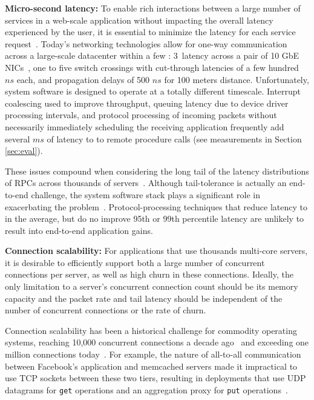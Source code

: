 {\bf Micro-second latency:} To enable rich interactions between a
large number of services in a web-scale application without impacting
the overall latency experienced by the user, it is essential to
minimize the latency for each service
request~\cite{luiz-isscc,rumble2011s}. Today's networking
technologies allow for one-way communication across a large-scale
datacenter within a few \microsecond : 3~\microsecond latency across
a pair of 10 GbE NICs~\cite{cisco-sereno}, one to five switch
crossings with cut-through latencies of a few hundred $ns$ each, and
propagation delays of 500 $ns$ for 100 meters distance. Unfortunately,
system software is designed to operate at a totally different
timescale. Interrupt coalescing used to improve throughput, queuing
latency due to device driver processing intervals, and protocol
processing of incoming packets without necessarily immediately
scheduling the receiving application frequently add several $ms$ of
latency to to remote procedure calls (see measurements in Section
\ref{sec:eval}).


These issues compound when considering the long tail of the latency
distributions of RPCs across thousands of
servers~\cite{DBLP:journals/cacm/DeanB13}. Although tail-tolerance is
actually an end-to-end challenge, the system software stack plays a
significant role in exacerbating the problem~\cite{Leverich:RHSU:2014}.
Protocol-processing techniques that reduce latency to \microsecond in
the average, but do no improve 95th or 99th percentile latency are
unlikely to result into end-to-end application gains.

{\bf Connection scalability:} For applications that use thousands
multi-core servers, it is desirable to efficiently support both a
large number of concurrent connections per server, as well as high
churn in these connections.  Ideally, the only limitation to a
server's concurrent connection count should be its memory capacity and
the packet rate and tail latency should be independent of the nunber
of concurrent connections or the rate of churn.
 
Connection scalability has been a historical challenge for commodity
operating systems, reaching 10,000 concurrent connections a decade
ago~\cite{theC10Kproblem} and exceeding one million connections
today~\cite{theC10Mproblem}. For example, the nature of all-to-all
communication between Facebook's application and memcached servers
made it impractical to use TCP sockets between these two tiers,
resulting in deployments that use UDP datagrams for \texttt{get}
operations and an aggregation proxy for \texttt{put}
operations~\cite{nishtala2013scaling}.

